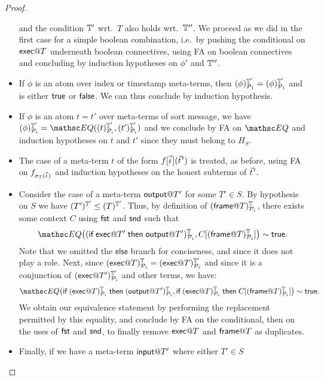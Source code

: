 \begin{proof}
\begin{itemize}
     and the condition $\mathbb{T}'$ wrt.\ $T$ also holds wrt.\ $\mathbb{T}''$.
     We proceed as we did in the first case for a simple boolean combination,
     i.e.\ by pushing the conditional on $\textsf{exec} @ T$ underneath boolean
     connectives, using \textsc{FA} on boolean connectives and concluding
     by induction hypotheses on $\phi'$ and $\mathbb{T}''$.
   \item If $\phi$ is an atom over index or timestamp meta-terms,
     then $(\phi)^{\mathbb{T}'}_{\mathcal{P}_1} = (\phi)^{\mathbb{T}'}_{\mathcal{P}_1}$
     and is either $\textsf{true}$ or $\textsf{false}$. We can thus conclude
     by induction hypothesis.
   \item If $\phi$ is an atom $t = t'$ over meta-terms of sort message,
     we have $\interp{\phi}{\TM'}{\calp_i} =
      \EQ(\interp{t}{\TM'}{\calp_i},\interp{t'}{\TM'}{\calp_i})$ and
     we conclude by \textsc{FA} on $\EQ$ and induction hypotheses
     on $t$ and $t'$ since they must belong to $H_S$.
   \item The case of a meta-term $t$ of the form $f[\pvec i](\pvec t')$
     is treated, as before, using \textsc{FA} on $f_{\sigma_\I(\pvec i)}$
     and induction hypotheses on the honest subterms of $\pvec t'$.
   \item Consider the case of a meta-term $\textsf{output} @ T'$ for some $T' \in S$.
     By hypothesis on $S$ we have $(T')^{\mathbb{T}'}_{} \leq (T)^{\mathbb{T}'}_{}$.
     Thus, by definition of $(\textsf{frame} @ T)^{\mathbb{T}}_{\mathcal{P}_i}$,
     there exists some context $C$ using $\mathsf{fst}$ and $\mathsf{snd}$
     such that
     $$\EQ\bigl(
     \interp{
       \myif \mexec @ T' \mythen \mout @ T'}{\TM}{\calp_i},
     C[\interp{\mframe @ T}{\TM}{\calp_i}]\bigr) \sim \true.$$
     Note that we omitted the $\mathsf{else}$ branch for conciseness, and
     since it does not play a role.
     Next, since $(\textsf{exec} @ T)^{\mathbb{T}}_{\mathcal{P}_i} =
     (\textsf{exec} @ T)^{\mathbb{T}'}_{\mathcal{P}_i}$ and since it is a conjunction of
     $(\textsf{exec} @ T')^{\mathbb{T}'}_{\mathcal{P}_i}$ and other terms, we have:
     $$\EQ\bigl(
     \myif \interp{\mexec @ T}{\TM}{\calp_i} \mythen
       \interp{\mout @ T'}{\TM}{\calp_i},
     \myif \interp{\mexec @ T}{\TM}{\calp_i} \mythen
     C[\interp{\mframe @ T}{\TM}{\calp_i}]
     \bigr)
     \sim \true.$$
     We obtain our equivalence statement
     by performing the replacement permitted by this equality,
     and conclude by \textsc{FA} on the conditional, then on the
     uses of $\mathsf{fst}$ and $\mathsf{snd}$, to finally remove $\textsf{exec} @ T$ and
     $\textsf{frame} @ T$ as duplicates.
   \item Finally, if we have a meta-term $\textsf{input} @ T'$ where either $T' \in S$

\end{itemize}
\end{proof}
